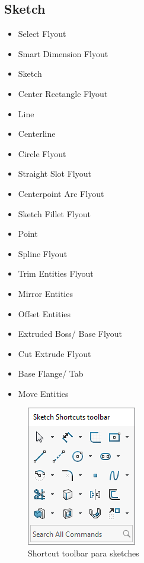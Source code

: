 \documentclass{report}
\begin{document}
\subsection{Sketch}

\begin{itemize}
	\item Select Flyout
	\item Smart Dimension Flyout
	\item Sketch
	\item Center Rectangle Flyout
	\item Line
	\item Centerline
	\item Circle Flyout
	\item Straight Slot Flyout
	\item Centerpoint Arc Flyout
	\item Sketch Fillet Flyout
	\item Point
	\item Spline Flyout
	\item Trim Entities Flyout
	\item Mirror Entities
	\item Offset Entities
	\item Extruded Boss/ Base Flyout
	\item Cut Extrude Flyout
	\item Base Flange/ Tab
	\item Move Entities
\end{itemize}

\begin{figure}[H]
	\centering
	\includegraphics[width=0.45\linewidth, height=0.5\textheight,keepaspectratio]{Imagenes/solidworks_shortcutbars_06}
	\caption{Shortcut toolbar para sketches}
	\label{fig:solidworksshortcutbars06}
\end{figure}
\end{document}
